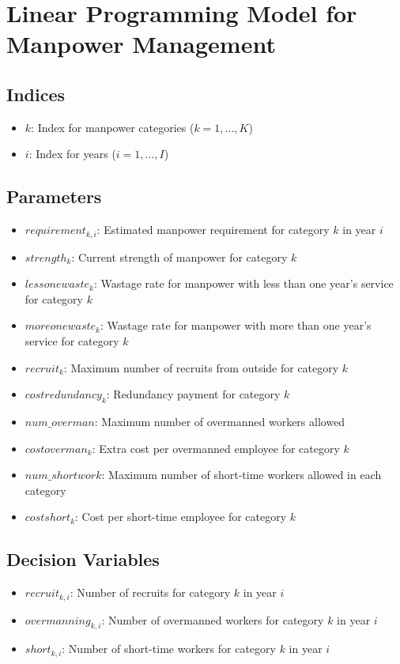 \documentclass{article}
\begin{document}
\section*{Linear Programming Model for Manpower Management}

\subsection*{Indices}
\begin{itemize}
    \item $k$: Index for manpower categories ($k = 1, \ldots, K$)
    \item $i$: Index for years ($i = 1, \ldots, I$)
\end{itemize}

\subsection*{Parameters}
\begin{itemize}
    \item $requirement_{k,i}$: Estimated manpower requirement for category $k$ in year $i$
    \item $strength_{k}$: Current strength of manpower for category $k$
    \item $lessonewaste_{k}$: Wastage rate for manpower with less than one year's service for category $k$
    \item $moreonewaste_{k}$: Wastage rate for manpower with more than one year's service for category $k$
    \item $recruit_{k}$: Maximum number of recruits from outside for category $k$
    \item $costredundancy_{k}$: Redundancy payment for category $k$
    \item $num\_overman$: Maximum number of overmanned workers allowed
    \item $costoverman_{k}$: Extra cost per overmanned employee for category $k$
    \item $num\_shortwork$: Maximum number of short-time workers allowed in each category
    \item $costshort_{k}$: Cost per short-time employee for category $k$
\end{itemize}

\subsection*{Decision Variables}
\begin{itemize}
    \item $recruit_{k,i}$: Number of recruits for category $k$ in year $i$
    \item $overmanning_{k,i}$: Number of overmanned workers for category $k$ in year $i$
    \item $short_{k,i}$: Number of short-time workers for category $k$ in year $i$
\end{itemize}
\end{document}
